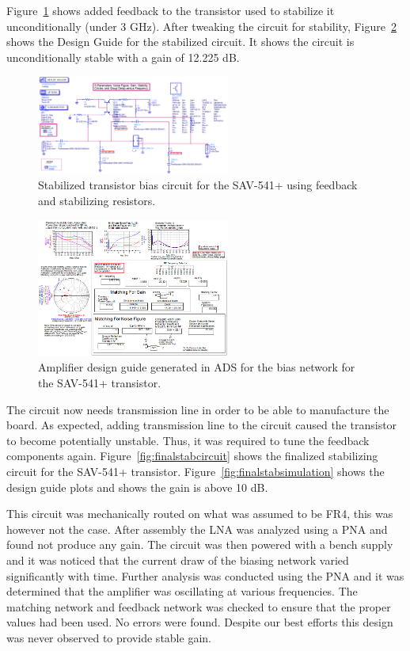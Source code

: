 \documentclass[conference]{IEEEtran}
\begin{document}
Figure~\ref{fig:designcuidecircuitstabilized} shows added feedback to the transistor used to stabilize it unconditionally (under 3 GHz). After tweaking the circuit for stability, Figure~\ref{fig:designcuidesimulationstabilized} shows the Design Guide for the stabilized circuit. It shows the circuit is unconditionally stable with a gain of 12.225 dB.

\begin{figure}[!h]
\centering
\includegraphics[width=2.5in]{pics/DesignGuideStablizedCircuit.png}
\caption{Stabilized transistor bias circuit for the SAV-541+ using feedback and stabilizing resistors.}
\label{fig:designcuidecircuitstabilized}
\end{figure}

\begin{figure}[!h]
\centering
\includegraphics[width=2.5in]{pics/DesignGuideStablizedSimulation.png}
\caption{Amplifier design guide generated in ADS for the bias network for the SAV-541+ transistor.}
\label{fig:designcuidesimulationstabilized}
\end{figure}

The circuit now needs transmission line in order to be able to manufacture the board. As expected, adding transmission line to the circuit caused the transistor to become potentially unstable. Thus, it was required to tune the feedback components again. Figure~\ref{fig:finalstabcircuit} shows the finalized stabilizing circuit for the SAV-541+ transistor. Figure~\ref{fig:finalstabsimulation} shows the design guide plots and shows the gain is above 10 dB.

This circuit was mechanically routed on what was assumed to be FR4, this was however not the case. After assembly the LNA was analyzed using a PNA and found not produce any gain. The circuit was then powered with a bench supply and it was noticed that the current draw of the biasing network varied significantly with time. Further analysis was conducted using the PNA and it was determined that the amplifier was oscillating at various frequencies. The matching network and feedback network was checked to ensure that the proper values had been used. No errors were found. Despite our best efforts this design was never observed to provide stable gain.
\end{document}
